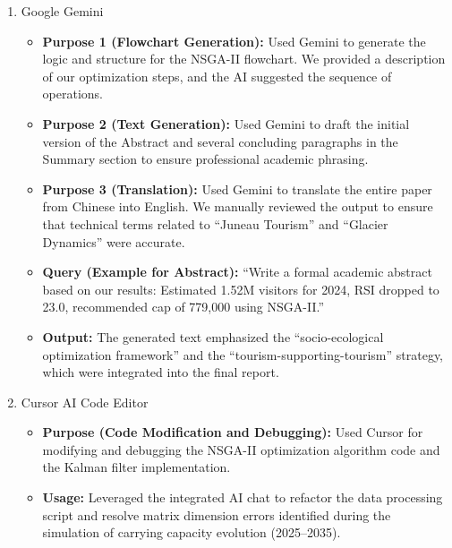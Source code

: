 \documentclass{mcmthesis}
\begin{document}
\begin{enumerate}
    \item Google Gemini
    \begin{itemize}
        \item \textbf{Purpose 1 (Flowchart Generation):} Used Gemini to generate the logic and structure for the NSGA-II flowchart. We provided a description of our optimization steps, and the AI suggested the sequence of operations.
        \item \textbf{Purpose 2 (Text Generation):} Used Gemini to draft the initial version of the Abstract and several concluding paragraphs in the Summary section to ensure professional academic phrasing.
        \item \textbf{Purpose 3 (Translation):} Used Gemini to translate the entire paper from Chinese into English. We manually reviewed the output to ensure that technical terms related to ``Juneau Tourism'' and ``Glacier Dynamics'' were accurate.
        \item \textbf{Query (Example for Abstract):} ``Write a formal academic abstract based on our results: Estimated 1.52M visitors for 2024, RSI dropped to 23.0, recommended cap of 779,000 using NSGA-II.''
        \item \textbf{Output:} The generated text emphasized the ``socio-ecological optimization framework'' and the ``tourism-supporting-tourism'' strategy, which were integrated into the final report.
    \end{itemize}

    \item Cursor AI Code Editor
    \begin{itemize}
        \item \textbf{Purpose (Code Modification and Debugging):} Used Cursor for modifying and debugging the NSGA-II optimization algorithm code and the Kalman filter implementation.
        \item \textbf{Usage:} Leveraged the integrated AI chat to refactor the data processing script and resolve matrix dimension errors identified during the simulation of carrying capacity evolution (2025--2035).
    \end{itemize}
\end{enumerate}
\end{document}
